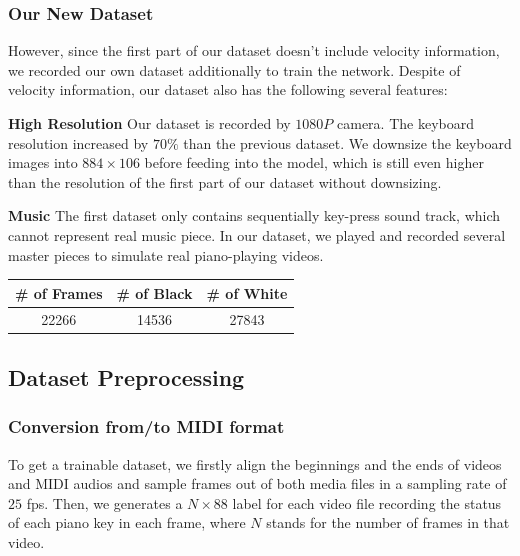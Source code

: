 \documentclass[10pt,twocolumn,letterpaper]{article}
\begin{document}
   \subsubsection{Our New Dataset}

   However, since the first part of our dataset doesn't include velocity information, we recorded our own dataset additionally to train the network.
   Despite of velocity information, our dataset also has the following several features:

   \textbf{High Resolution} Our dataset is recorded by $1080P$ camera. The keyboard resolution increased by $70\%$ than the previous dataset. We downsize the keyboard images into \(884 \times 106\) before feeding into the model, which is still even higher than the resolution of the first part of our dataset without downsizing.

   \textbf{Music} The first dataset only contains sequentially key-press sound track, which cannot represent real music piece. 
   In our dataset, we played and recorded several master pieces to simulate real piano-playing videos.\\

   \begin{minipage}{0.9\linewidth}
      \centering
   \begin{tabular}{ccc}
      \toprule
      \# of Frames&\# of Black&\# of White\\
      \midrule
      22266&14536&27843\\
      \bottomrule
      \end{tabular}
       \label{tab:ourdataset} 
   \end{minipage}

\subsection{Dataset Preprocessing}

\subsubsection{Conversion from/to MIDI format}

To get a trainable dataset, we firstly align the beginnings and the ends of videos and MIDI audios and sample frames out of both media files in a sampling rate of $25$ fps. 
Then, we generates a \(N \times 88\) label for each video file recording the status of each piano key in each frame, where \(N\) stands for the number of frames in that video.
\end{document}
